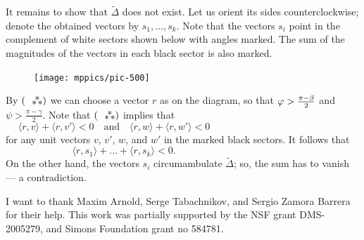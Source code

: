 \documentclass[oneside,a4paper]{amsart}
\begin{document}
It remains to show that $\tilde\Delta$ does not exist.
Let us orient its sides counterclockwise;
denote the obtained vectors by $s_1,\dots,s_k$.
Note that the vectors $s_i$ point in the complement of white sectors shown below with angles marked.
The sum of the magnitudes of the vectors in each black sector is also marked.

\begin{figure}
\vskip-6mm
\centering
\texttt{[image: mppics/pic-500]}
\vskip7mm
\end{figure}

By $(\asterism)$ we can choose a vector $r$ as on the diagram, so that $\phi\z>\tfrac{\pi-\beta}2$ and $\psi>\tfrac{\pi-\gamma}2$.
Note that $(\asterism)$ implies that
\[\langle r,v\rangle+\langle r,v'\rangle<0\quad\text{and}\quad \langle r,w\rangle+\langle r,w'\rangle<0\qquad\qquad\qquad\qquad\qquad\qquad\qquad\]
for any unit vectors $v$, $v'$, $w$, and $w'$ in the marked black sectors.
It follows that 
\[
\langle r,s_1\rangle+\dots+\langle r,s_k\rangle<0.\qquad\qquad\qquad\qquad\qquad\qquad
\]
On the other hand, the vectors $s_i$ circumambulate $\tilde\Delta$;
so, the sum has to vanish
--- a contradiction.

{\small {}
I want to thank Maxim Arnold, Serge Tabachnikov, and Sergio Zamora Barrera for their help.
This work was partially supported by the NSF grant DMS-2005279, and Simons Foundation grant no 584781.}



{\sloppy
\printbibliography
\fussy
}
\end{document}
